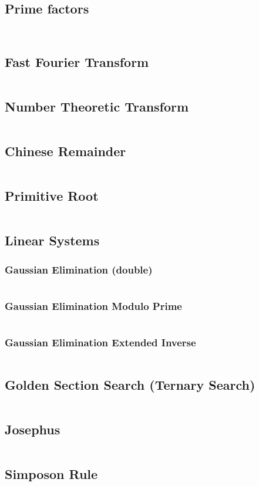 \documentclass[a4paper, 10pt, twocolumn, landscape]{article}
\begin{document}
\subsection{Prime factors}
\inputminted{cpp}{math/prime-factors.cpp}
\inputminted{cpp}{math/pollard-rho.cpp}
\subsection{Fast Fourier Transform}
\inputminted{cpp}{math/fft.cpp}
\subsection{Number Theoretic Transform}
\inputminted{cpp}{math/ntt.cpp}
\subsection{Chinese Remainder}
\inputminted{cpp}{math/chinese.cpp}
\subsection{Primitive Root}
\inputminted{cpp}{math/primitive-root.cpp}
\subsection{Linear Systems}
\subsubsection{Gaussian Elimination (double)}
\inputminted{cpp}{math/gauss-elim.cpp}
\subsubsection{Gaussian Elimination Modulo Prime}
\inputminted{cpp}{math/gauss-elim-prime.cpp}
\subsubsection{Gaussian Elimination Extended Inverse}
\inputminted{cpp}{math/gauss-elim-ext.cpp}
\subsection{Golden Section Search (Ternary Search)}
\inputminted{cpp}{math/gss.cpp}
\subsection{Josephus}
\inputminted{cpp}{math/josephus.cpp}
\subsection{Simposon Rule}
\inputminted{cpp}{math/simpson-rule.cpp}
\end{document}
